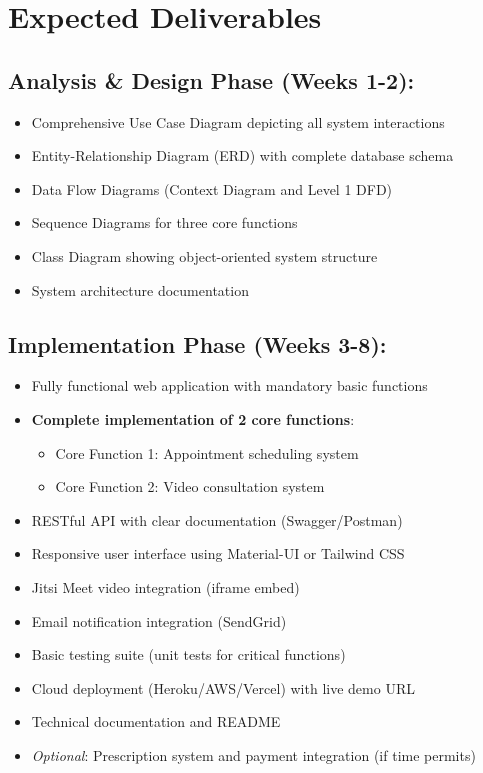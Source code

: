 \documentclass[11pt,a4paper]{article}
\begin{document}
\section{Expected Deliverables}

\subsection*{Analysis \& Design Phase (Weeks 1-2):}
\begin{itemize}[leftmargin=*, itemsep=0.1em]
    \item Comprehensive Use Case Diagram depicting all system interactions
    \item Entity-Relationship Diagram (ERD) with complete database schema
    \item Data Flow Diagrams (Context Diagram and Level 1 DFD)
    \item Sequence Diagrams for three core functions
    \item Class Diagram showing object-oriented system structure
    \item System architecture documentation
\end{itemize}

\subsection*{Implementation Phase (Weeks 3-8):}
\begin{itemize}[leftmargin=*, itemsep=0.1em]
    \item Fully functional web application with mandatory basic functions
    \item \textbf{Complete implementation of 2 core functions}:
    \begin{itemize}
        \item Core Function 1: Appointment scheduling system
        \item Core Function 2: Video consultation system
    \end{itemize}
    \item RESTful API with clear documentation (Swagger/Postman)
    \item Responsive user interface using Material-UI or Tailwind CSS
    \item Jitsi Meet video integration (iframe embed)
    \item Email notification integration (SendGrid)
    \item Basic testing suite (unit tests for critical functions)
    \item Cloud deployment (Heroku/AWS/Vercel) with live demo URL
    \item Technical documentation and README
    \item \textit{Optional}: Prescription system and payment integration (if time permits)
\end{itemize}
\end{document}
